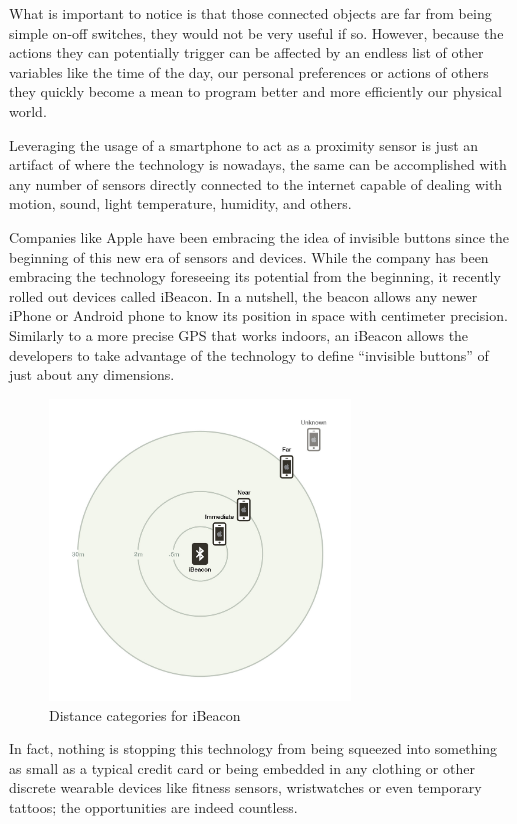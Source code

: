 What is important to notice is that those connected objects are far from being simple on-off switches, they would not be very useful if so. However, because the actions they can potentially trigger can be affected by an endless list of other variables like the time of the day, our personal preferences or actions of others they quickly become a mean to program better and more efficiently our physical world.

Leveraging the usage of a smartphone to act as a proximity sensor is just an artifact of where the technology is nowadays, the same can be accomplished with any number of sensors directly connected to the internet capable of dealing with motion, sound, light temperature, humidity, and others.

Companies like Apple have been embracing the idea of invisible buttons since the beginning of this new era of sensors and devices. 
While the company has been embracing the technology foreseeing its potential from the beginning, it recently rolled out devices called iBeacon. In a nutshell, the beacon allows any newer iPhone or Android phone to know its position in space with centimeter precision. Similarly to a more precise GPS that works indoors, an iBeacon allows the developers to take advantage of the technology to define “invisible buttons” of just about any dimensions.

\vspace{0.5cm}
\begin{figure}[htbp]
  \centering
    \includegraphics[height=8cm]{images/ibeacon-distance.jpg}
  \caption{Distance categories for iBeacon}
  \label{fig:ibeacon}
\end{figure}
\vspace{0.5cm}


In fact, nothing is stopping this technology from being squeezed into something as small as a typical credit card or being embedded in any clothing or other discrete wearable devices like fitness sensors, wristwatches or even temporary tattoos; the opportunities are indeed countless.

